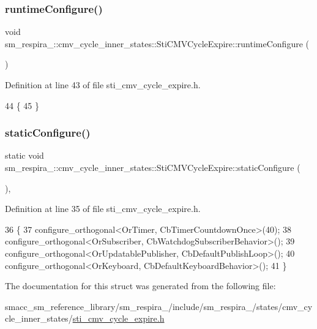 \subsubsection{\texorpdfstring{runtime\+Configure()}{runtimeConfigure()}}
{\footnotesize\ttfamily void sm\+\_\+respira\+\_\+::cmv\+\_\+cycle\+\_\+inner\+\_\+states\+::\+Sti\+C\+M\+V\+Cycle\+Expire\+::runtime\+Configure (\begin{DoxyParamCaption}{ }\end{DoxyParamCaption})\hspace{0.3cm}{\ttfamily [inline]}}



Definition at line 43 of file sti\+\_\+cmv\+\_\+cycle\+\_\+expire.\+h.


\begin{DoxyCode}
44   \{
45   \}
\end{DoxyCode}
\mbox{\label{structsm__respira__1_1_1cmv__cycle__inner__states_1_1StiCMVCycleExpire_a2e2e0280d9bd82d9fcd6877332dcb68b}} 
\subsubsection{\texorpdfstring{static\+Configure()}{staticConfigure()}}
{\footnotesize\ttfamily static void sm\+\_\+respira\+\_\+::cmv\+\_\+cycle\+\_\+inner\+\_\+states\+::\+Sti\+C\+M\+V\+Cycle\+Expire\+::static\+Configure (\begin{DoxyParamCaption}{ }\end{DoxyParamCaption})\hspace{0.3cm}{\ttfamily [inline]}, {\ttfamily [static]}}



Definition at line 35 of file sti\+\_\+cmv\+\_\+cycle\+\_\+expire.\+h.


\begin{DoxyCode}
36   \{
37     configure\_orthogonal<OrTimer, CbTimerCountdownOnce>(40);
38     configure\_orthogonal<OrSubscriber, CbWatchdogSubscriberBehavior>();
39     configure\_orthogonal<OrUpdatablePublisher, CbDefaultPublishLoop>();
40     configure\_orthogonal<OrKeyboard, CbDefaultKeyboardBehavior>();
41   \}
\end{DoxyCode}


The documentation for this struct was generated from the following file\+:\begin{DoxyCompactItemize}
\item 
smacc\+\_\+sm\+\_\+reference\+\_\+library/sm\+\_\+respira\+\_/include/sm\+\_\+respira\+\_/states/cmv\+\_\+cycle\+\_\+inner\+\_\+states/\hyperlink{sti__cmv__cycle__expire_8h}{sti\+\_\+cmv\+\_\+cycle\+\_\+expire.\+h}\end{DoxyCompactItemize}
